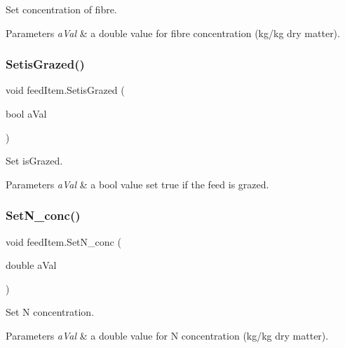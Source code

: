 Set concentration of fibre. 


\begin{DoxyParams}{Parameters}
{\em a\+Val} & a double value for fibre concentration (kg/kg dry matter). \\
\hline
\end{DoxyParams}
\mbox{\label{classfeed_item_aaaed481d4af8ab0cb4a06983efcaa08c}} 
\subsubsection{\texorpdfstring{SetisGrazed()}{SetisGrazed()}}
{\footnotesize\ttfamily void feed\+Item.\+Setis\+Grazed (\begin{DoxyParamCaption}\item[{bool}]{a\+Val }\end{DoxyParamCaption})\hspace{0.3cm}{\ttfamily [inline]}}



Set is\+Grazed. 


\begin{DoxyParams}{Parameters}
{\em a\+Val} & a bool value set true if the feed is grazed. \\
\hline
\end{DoxyParams}
\mbox{\label{classfeed_item_a86895df478a6843340ee4c75197b3ab0}} 
\subsubsection{\texorpdfstring{SetN\_conc()}{SetN\_conc()}}
{\footnotesize\ttfamily void feed\+Item.\+Set\+N\+\_\+conc (\begin{DoxyParamCaption}\item[{double}]{a\+Val }\end{DoxyParamCaption})\hspace{0.3cm}{\ttfamily [inline]}}



Set N concentration. 


\begin{DoxyParams}{Parameters}
{\em a\+Val} & a double value for N concentration (kg/kg dry matter). \\
\hline
\end{DoxyParams}
\mbox{\label{classfeed_item_adb5ed4f3fb13af47befd3c63d5005405}} 
